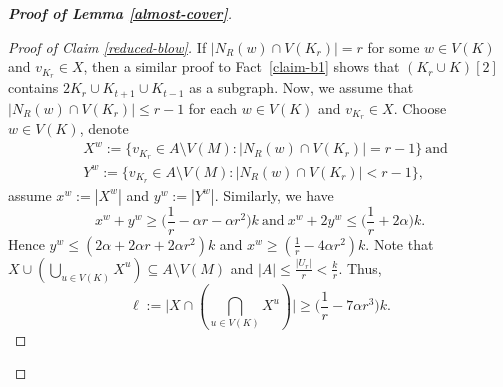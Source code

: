 \documentclass[11pt, a4paper]{article}
\theoremstyle{definition}
\newcommand{\<}{\subseteq}
\begin{document}
\begin{proof}[\bf Proof of Lemma \ref{almost-cover}]
\begin{proof}[Proof of Claim \ref{reduced-blow}]
If $|N_R(w)\cap V(K_r)|=r$ for some $w\in V(K)$ and $v_{K_r}\in X$, then a similar proof to Fact~\ref{claim-b1} shows that $(K_r\cup K)[2]$ contains $2K_r\cup K_{t+1}\cup K_{t-1}$ as a subgraph. Now, we assume that $|N_R(w)\cap V(K_r)|\leq r-1$ for each $w\in V(K)$ and $v_{K_r}\in X$. %
Choose $w\in V(K)$, denote 
\begin{align*}
&X^w:=\{v_{K_r}\in  A\setminus V(M): |N_R(w)\cap V(K_r)|=r-1\}\ \text{and}\\
&Y^w:=\{v_{K_r}\in  A\setminus V(M): |N_R(w)\cap V(K_r)|<r-1\},
\end{align*}
assume $x^w:=|X^w|$ and $y^w:=|Y^w|$.  Similarly, we have 
$$
x^w+y^w\geq \Big(\frac{1}{r}-\alpha r-\alpha r^2\Big)k\ \text{and}\ x^w+2y^w\leq \Big(\frac{1}{r}+2\alpha\Big)k.
$$
Hence $y^w\leq (2\alpha+2\alpha r+2\alpha r^2)k$ and $x^w\geq (\frac{1}{r}-4\alpha r^2)k$. Note that $X\cup (\bigcup_{u\in V(K)}X^u)\subseteq A\setminus V(M)$ and $|A|\leq \frac{|U_r|}{r}<\frac{k}{r}$. Thus,  $$\ell:=\Big|X\cap (\bigcap_{u\in V(K)}X^u)\Big|\geq \Big(\frac{1}{r}-7\alpha r^3\Big)k.$$  


\end{proof}
\end{proof}
\end{document}
